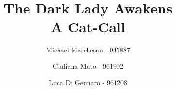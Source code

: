 \begin{titlepage}


\title{The Dark Lady Awakens \\ A Cat-Call}
\author{Michael Marchesan - 945887 \and Giuliana Muto - 961902 \and Luca Di Gennaro - 961208}
\date{}
\maketitle

\end{titlepage}